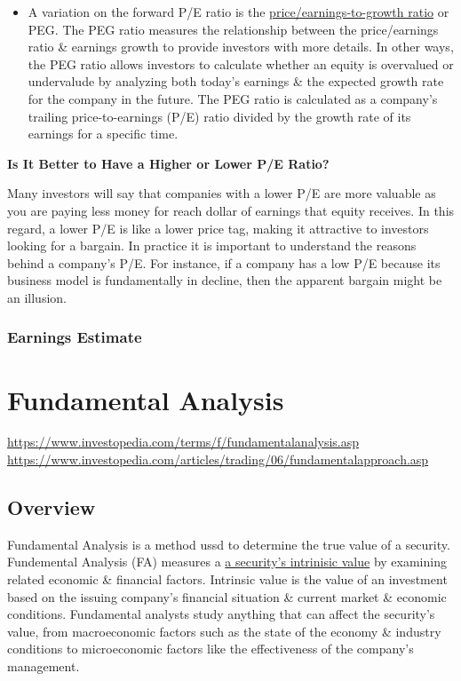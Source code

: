 \documentclass{article}
\begin{document}
\begin{itemize}
\begin{itemize}
					\item A variation on the forward P/E ratio is the \underline{price/earnings-to-growth ratio} or PEG. The PEG ratio measures the relationship between the price/earnings ratio \& earnings growth to provide investors with more details. In other ways, the PEG ratio allows investors to calculate whether an equity is overvalued or undervalude by analyzing both today's earnings \& the expected growth rate for the company in the future. The PEG ratio is calculated as a company's trailing price-to-earnings (P/E) ratio divided by the growth rate of its earnings for a specific time.
				\end{itemize}
		\end{itemize}
	{\bf Is It Better to Have a Higher or Lower P/E Ratio?} \newline

	Many investors will say that companies with a lower P/E are more valuable as you are paying less money for reach dollar of earnings that equity receives. In this regard, a lower P/E is like a lower price tag, making it attractive to investors looking for a bargain. In practice it is important to understand the reasons behind a company's P/E. For instance, if a company has a low P/E because its business model is fundamentally in decline, then the apparent bargain might be an illusion.

	\subsubsection{Earnings Estimate}



	\section{Fundamental Analysis}
	\url{https://www.investopedia.com/terms/f/fundamentalanalysis.asp} \newline
	\url{https://www.investopedia.com/articles/trading/06/fundamentalapproach.asp}

	\subsection{Overview}

	Fundamental Analysis is a method ussd to determine the true value of a security. Fundemental Analysis (FA) measures a \href{https://www.investopedia.com/terms/v/valuation.asp}{a security's intrinisic value}
	by examining related economic \& financial factors. Intrinsic value is the value of an investment based on the issuing company's financial situation \& current market \& economic conditions.
	Fundamental analysts study anything that can affect the security's value, from macroeconomic factors such as the state of the economy \& industry conditions to microeconomic factors like the 
	effectiveness of the company's management. \newline
\end{document}
